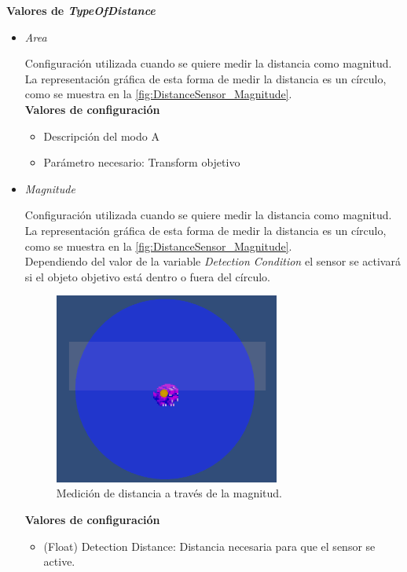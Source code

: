 \textbf{Valores de \textit{TypeOfDistance}}

\begin{itemize}
	\item \textit{Area}

Configuración utilizada cuando se quiere medir la distancia como magnitud. La representación gráfica de esta forma de medir la distancia es un círculo, como se muestra en la \autoref{fig:DistanceSensor_Magnitude}.\\

\textbf{Valores de configuración}
	\begin{itemize}
	        \item Descripción del modo A
	        \item Parámetro necesario: Transform objetivo
	 \end{itemize}
	\item \textit{Magnitude}

	Configuración utilizada cuando se quiere medir la distancia como magnitud. La representación gráfica de esta forma de medir la distancia es un círculo, como se muestra en la \autoref{fig:DistanceSensor_Magnitude}.\\
Dependiendo del valor de la variable \textit{Detection Condition} el sensor se activará si el objeto objetivo está dentro o fuera del círculo.
	\begin{figure}[t]
		\centering
		\includegraphics[width = 0.7\textwidth]{Imagenes/DistanceSensorMagnitude.png}
		\caption{Medición de distancia a través de la magnitud.}
		\label{fig:DistanceSensor_Magnitude}
	\end{figure}

	\textbf{Valores de configuración}
	\begin{itemize}
	        \item (Float) Detection Distance: Distancia necesaria para que el sensor se active.
	 \end{itemize}


\end{itemize}
